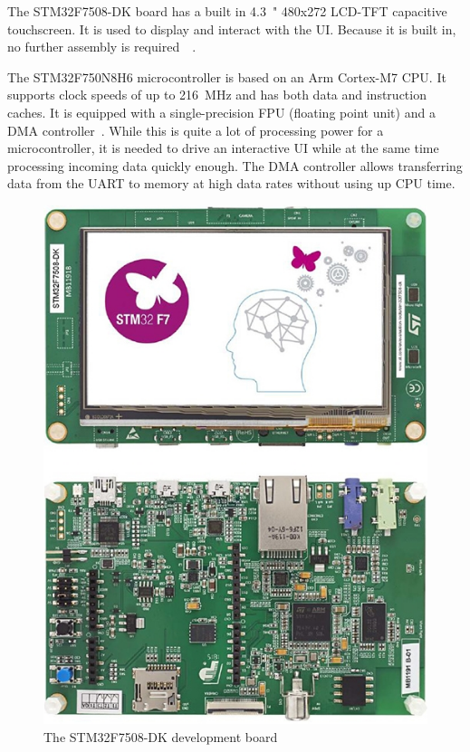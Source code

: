 The STM32F7508-DK board has a built in \SI{4.3}{"} 480x272 LCD-TFT capacitive touchscreen. It is
used to display and interact with the UI. Because it is built in, no further assembly is required~\
\cite{board-user-manual}.

The STM32F750N8H6 microcontroller is based on an Arm Cortex-M7 CPU. It supports clock speeds of up to
\SI{216}{\mega\hertz} and has both data and instruction caches. It is equipped with a single-precision
FPU (floating point unit) and a DMA controller~\cite{mcu-datasheet}. While this is quite a lot of
processing power for a microcontroller, it is needed to drive an interactive UI while at the same time
processing incoming data quickly enough. The DMA controller allows transferring data from the UART to
memory at high data rates without using up CPU time.

\begin{figure}[h]
    \centering
    \includegraphics[scale=0.4]{img/board.jpg}
    \caption[The STM32F7508-DK development board]{
        The STM32F7508-DK development board\footnotemark
    }
\end{figure}

